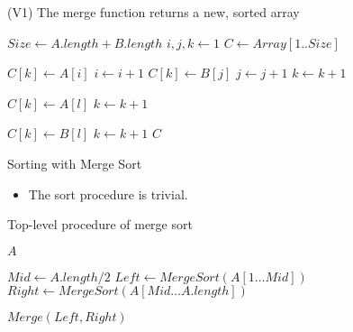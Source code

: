 \begin{frame}
\begin{block}{(V1) The merge function returns a new, sorted array}
\begin{scriptsize}
    \begin{algorithmic}
       \State $Size \gets A.length + B.length$ 
       \State $i, j, k \gets 1$  
       \State $C \gets Array[1 .. Size]$ 

           \State $C[k] \gets A[i]$
           \State $i \gets i + 1$
         \Else
           \State $C[k] \gets B[j]$
           \State $j \gets j + 1$
         \EndIf
         \State $k \gets k + 1$  
       \EndWhile
         
         \State $C[k] \gets A[l]$
         \State $k \gets k + 1$
       \EndFor

        \State $C[k] \gets B[l]$
        \State $k \gets k + 1$
       \EndFor 
        $C$
    \EndProcedure
    \end{algorithmic}
\end{scriptsize}
\end{block}
\end{frame}

\begin{frame}{Sorting with Merge Sort}

  \begin{itemize}
    \item The sort procedure is trivial. 
  \end{itemize}

  \pause

  \begin{block}{Top-level procedure of merge sort}
    \begin{scriptsize}
    \begin{algorithmic}
          $A$
        \EndIf

        \State $Mid \gets A.length / 2$
        \State $Left  \gets MergeSort(A[1 \ldots Mid])$
        \State $Right \gets MergeSort(A[Mid \ldots A.length])$

         $Merge(Left, Right)$ 
      \EndProcedure
    \end{algorithmic}
    \end{scriptsize}
  \end{block}   
\end{frame}

